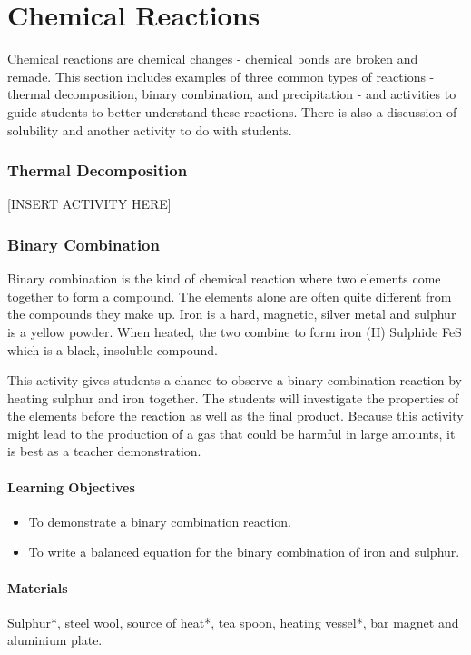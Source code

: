 \chapter{Chemical Reactions}

Chemical reactions are chemical changes - chemical bonds are broken and remade. This section includes examples of three common types of reactions - thermal decomposition, binary combination, and precipitation - and activities to guide students to better understand these reactions. There is also a discussion of solubility and another activity to do with students.

\subsection{Thermal Decomposition}

[INSERT ACTIVITY HERE]

\subsection{Binary Combination}
Binary combination is the kind of chemical reaction where two elements come together to form a compound. The elements alone are often quite different from the compounds they make up. Iron is a hard, magnetic, silver metal and sulphur is a yellow powder. When heated, the two combine to form iron (II) Sulphide FeS which is a black, insoluble compound. 

This activity gives students a chance to observe a binary combination reaction by heating sulphur and iron together. The students will investigate the properties of the elements before the reaction as well as the final product. Because this activity might lead to the production of a gas that could be harmful in large amounts, it is best as a teacher demonstration.

\subsubsection*{Learning Objectives}
\begin{itemize}
\item{To demonstrate a binary combination reaction.}
\item{To write a balanced equation for the binary combination of iron and sulphur.}
\end{itemize}

\subsubsection*{Materials}
Sulphur*, steel wool, source of heat*, tea spoon, heating vessel*, bar magnet and aluminium plate.

